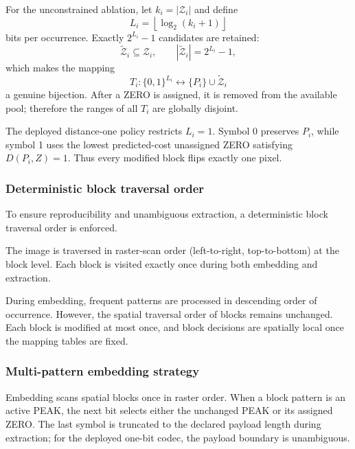 \documentclass[a4paper,fleqn]{cas-dc}
\newcommand{\RevisionAddBegin}{\begingroup\color{revisionblue}}
\newcommand{\RevisionAddEnd}{\endgroup}
\begin{document}
For the unconstrained ablation, let $k_i=|\mathcal{Z}_i|$ and define
\begin{equation}
L_i = \left\lfloor \log_2 (k_i + 1) \right\rfloor
\label{eq:bits-per-occurrence}
\end{equation}
bits per occurrence. Exactly $2^{L_i}-1$ candidates are retained:
\begin{equation}
\widetilde{\mathcal Z}_i\subseteq\mathcal Z_i,\qquad
|\widetilde{\mathcal Z}_i|=2^{L_i}-1,
\label{eq:retained-zero-set}
\end{equation}
which makes the mapping
\begin{equation}
T_i:\{0,1\}^{L_i}\longleftrightarrow
\{P_i\}\cup\widetilde{\mathcal Z}_i
\label{eq:local-bijection}
\end{equation}
a genuine bijection. After a ZERO is assigned, it is removed from the
available pool; therefore the ranges of all $T_i$ are globally disjoint.

The deployed distance-one policy restricts $L_i=1$. Symbol 0 preserves
$P_i$, while symbol 1 uses the lowest predicted-cost unassigned ZERO satisfying
$D(P_i,Z)=1$. Thus every modified block flips exactly one pixel.

\subsubsection*{Deterministic block traversal order}
\label{subsec:order}

To ensure reproducibility and unambiguous extraction, a deterministic block traversal order is enforced.

The image is traversed in raster-scan order (left-to-right, top-to-bottom) at the block level.
Each block is visited exactly once during both embedding and extraction.

During embedding, frequent patterns are processed in descending order of occurrence.
However, the spatial traversal order of blocks remains unchanged.
\RevisionAddBegin
Each block is modified at most once, and block decisions are spatially local
once the mapping tables are fixed.
\RevisionAddEnd

\subsubsection*{Multi-pattern embedding strategy}
\label{subsec:multi_pattern}

Embedding scans spatial blocks once in raster order. When a block pattern is
an active PEAK, the next bit selects either the unchanged PEAK or its assigned
ZERO. The last symbol is truncated to the declared payload length during
\RevisionAddBegin
extraction; for the deployed one-bit codec, the payload boundary is
unambiguous.
\RevisionAddEnd
\end{document}
